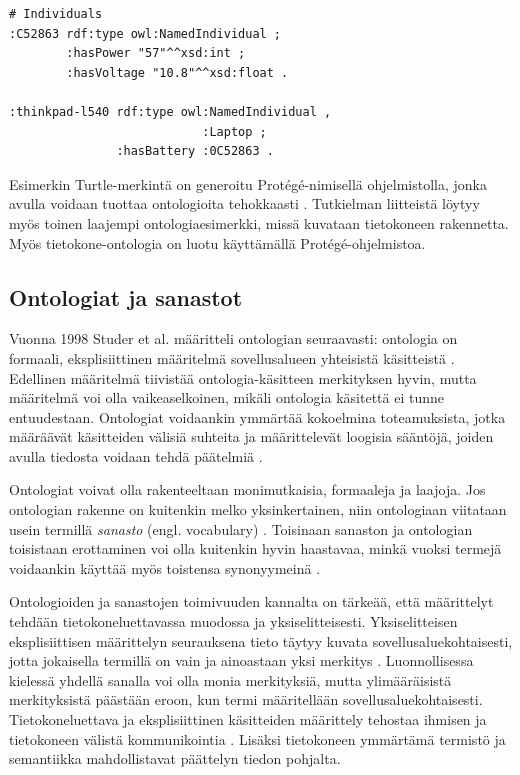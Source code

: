 \documentclass[finnish, 12pt, a4paper, elec, utf8, pdfa, online]{aaltothesis}
\begin{document}
{\begin{lstlisting}[style=codeblock,caption={OWL esimerkki.},captionpos=b,label={owl_esim}]
# Individuals
:C52863 rdf:type owl:NamedIndividual ;
        :hasPower "57"^^xsd:int ;
        :hasVoltage "10.8"^^xsd:float .

:thinkpad-l540 rdf:type owl:NamedIndividual ,
                           :Laptop ;
               :hasBattery :0C52863 .

\end{lstlisting}
\vskip 0.75cm
Esimerkin Turtle-merkintä on generoitu Protégé-nimisellä ohjelmistolla, jonka avulla voidaan tuottaa ontologioita tehokkaasti \cite{Protege}. Tutkielman liitteistä löytyy myös toinen laajempi ontologiaesimerkki, missä kuvataan tietokoneen rakennetta. Myös tietokone-ontologia on luotu käyttämällä Protégé-ohjelmistoa.


\subsection{Ontologiat ja sanastot}
Vuonna 1998 Studer et al. määritteli ontologian seuraavasti: ontologia on formaali, eksplisiittinen määritelmä sovellusalueen yhteisistä käsitteistä \cite{ontology_def}.  Edellinen määritelmä tiivistää ontologia-käsitteen merkityksen hyvin, mutta määritelmä voi olla vaikeaselkoinen, mikäli ontologia käsitettä ei tunne entuudestaan. Ontologiat voidaankin ymmärtää kokoelmina toteamuksista, jotka määräävät käsitteiden välisiä suhteita ja määrittelevät loogisia sääntöjä, joiden avulla tiedosta voidaan tehdä päätelmiä \cite{Berners_visio}.

Ontologiat voivat olla rakenteeltaan monimutkaisia, formaaleja ja laajoja. Jos ontologian rakenne on kuitenkin melko yksinkertainen, niin ontologiaan viitataan usein termillä \textit{sanasto} (engl. vocabulary) \cite{vocabulary}. Toisinaan sanaston ja ontologian toisistaan erottaminen voi olla kuitenkin hyvin haastavaa, minkä vuoksi termejä voidaankin käyttää myös toistensa synonyymeinä \cite{vocabulary}.

Ontologioiden ja sanastojen toimivuuden kannalta on tärkeää, että määrittelyt tehdään tietokoneluettavassa muodossa ja yksiselitteisesti. Yksiselitteisen eksplisiittisen määrittelyn seurauksena tieto täytyy kuvata sovellusaluekohtaisesti, jotta jokaisella termillä on vain ja ainoastaan yksi merkitys \cite{RDF_specification}. Luonnollisessa kielessä yhdellä sanalla voi olla monia merkityksiä, mutta ylimääräisistä merkityksistä päästään eroon, kun termi määritellään sovellusaluekohtaisesti. Tietokoneluettava ja eksplisiittinen käsitteiden määrittely tehostaa ihmisen ja tietokoneen välistä kommunikointia \cite{ontology_learning}. Lisäksi tietokoneen ymmärtämä termistö ja semantiikka mahdollistavat päättelyn tiedon pohjalta.

}
\end{document}
